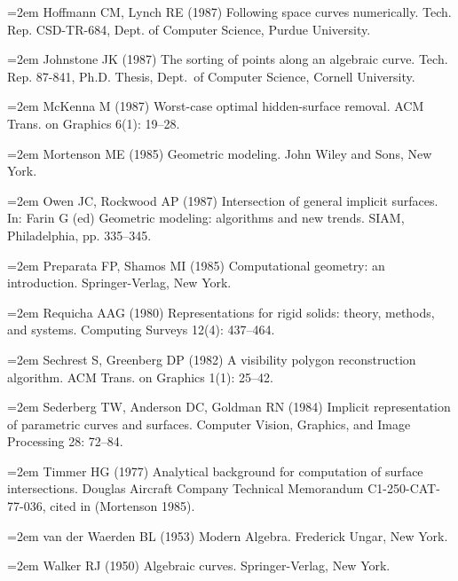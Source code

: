 \hangindent=2em  %
\noindent 
Hoffmann CM, Lynch RE (1987) 
Following space curves numerically.
Tech. Rep. CSD-TR-684, Dept. of Computer Science, Purdue University.

\hangindent=2em  %
\noindent 
Johnstone JK (1987) The sorting of points along an algebraic curve.
Tech. Rep. 87-841, Ph.D. Thesis, Dept.\ of Computer Science, Cornell University.

\hangindent=2em  %
\noindent 
McKenna M (1987)
Worst-case optimal hidden-surface removal.
ACM Trans. on Graphics 6(1): 19--28.


\hangindent=2em  %
\noindent 
Mortenson ME (1985) Geometric modeling.
John Wiley and Sons, New York.

\hangindent=2em  %
\noindent 
Owen JC, Rockwood AP (1987)
Intersection of general implicit surfaces.
In: Farin G (ed) \mbox{Geometric} modeling: algorithms and new trends.
SIAM, Philadelphia, pp. 335--345.

\hangindent=2em  %
\noindent 
Preparata FP, Shamos MI (1985) Computational geometry: an introduction.
Springer-Verlag, New York.

\hangindent=2em  %
\noindent 
Requicha AAG (1980) 
Representations for rigid solids: theory, methods, and systems.
Computing Surveys 12(4): 437--464.

\hangindent=2em  %
\noindent 
Sechrest S, Greenberg DP (1982)
A visibility polygon reconstruction algorithm.
ACM Trans. on Graphics 1(1): 25--42.

\hangindent=2em  %
\noindent 
Sederberg TW, Anderson DC, Goldman RN (1984)
Implicit representation of parametric curves and surfaces.
Computer Vision, Graphics, and Image Processing 28: 72--84.

\hangindent=2em  %
\noindent 
Timmer HG (1977) 
Analytical background for computation of surface intersections.
Douglas Aircraft Company Technical Memorandum C1-250-CAT-77-036, 
cited in (Mortenson 1985). 

\hangindent=2em  %
\noindent 
van der Waerden BL (1953) Modern Algebra.
Frederick Ungar, New York.

\hangindent=2em  %
\noindent 
Walker RJ (1950) Algebraic curves.
Springer-Verlag, New York.


